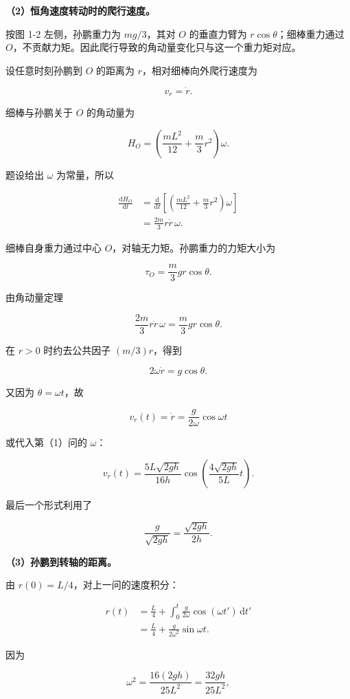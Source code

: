 \documentclass[12pt,a4paper,UTF8]{ctexart}
\begin{document}
\textbf{（2）恒角速度转动时的爬行速度。}

按图 1-2 左侧，孙鹏重力为 \(mg/3\)，其对 \(O\) 的垂直力臂为
\(r\cos\theta\)；细棒重力通过
\(O\)，不贡献力矩。因此爬行导致的角动量变化只与这一个重力矩对应。

设任意时刻孙鹏到 \(O\) 的距离为 \(r\)，相对细棒向外爬行速度为

\[v_r=\dot r.\]

细棒与孙鹏关于 \(O\) 的角动量为

\[H_O=\left(\frac{mL^2}{12}+\frac m3r^2\right)\omega.\]

题设给出 \(\omega\) 为常量，所以

\[
\begin{aligned}
\frac{\mathrm dH_O}{\mathrm dt}
&=\frac{\mathrm d}{\mathrm dt}\left[\left(\frac{mL^2}{12}+\frac m3r^2\right)\omega\right]\\
&=\frac{2m}{3}r\dot r\,\omega.
\end{aligned}
\]

细棒自身重力通过中心 \(O\)，对轴无力矩。孙鹏重力的力矩大小为

\[\tau_O=\frac m3gr\cos\theta.\]

由角动量定理

\[\frac{2m}{3}r\dot r\,\omega=\frac m3gr\cos\theta.\]

在 \(r>0\) 时约去公共因子 \((m/3)r\)，得到

\[2\omega\dot r=g\cos\theta.\]

又因为 \(\theta=\omega t\)，故

\[
\boxed{v_r(t)=\dot r=\frac{g}{2\omega}\cos\omega t}
\]

或代入第（1）问的 \(\omega\)：

\[
\boxed{v_r(t)=\frac{5L\sqrt{2gh}}{16h}\cos\left(\frac{4\sqrt{2gh}}{5L}t\right)}.
\]

最后一个形式利用了

\[\frac{g}{\sqrt{2gh}}=\frac{\sqrt{2gh}}{2h}.\]

\textbf{（3）孙鹏到转轴的距离。}

由 \(r(0)=L/4\)，对上一问的速度积分：

\[
\begin{aligned}
r(t)
&=\frac L4+\int_0^t\frac{g}{2\omega}\cos(\omega t')\,\mathrm dt'\\
&=\frac L4+\frac{g}{2\omega^2}\sin\omega t.
\end{aligned}
\]

因为

\[\omega^2=\frac{16(2gh)}{25L^2}=\frac{32gh}{25L^2},\]
\end{document}
